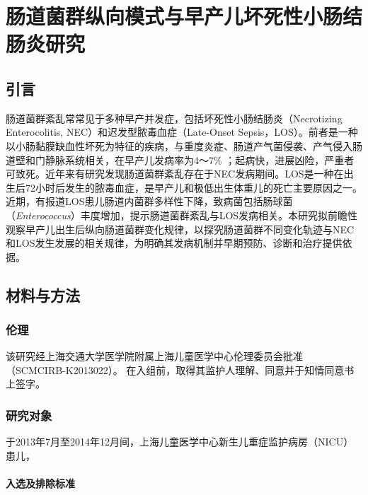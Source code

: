 
\chapter{肠道菌群纵向模式与早产儿坏死性小肠结肠炎研究}
\label{chap:nec}

\section{引言}
肠道菌群紊乱常常见于多种早产并发症，包括坏死性小肠结肠炎（Necrotizing Enterocolitis, NEC）和迟发型脓毒血症（Late-Onset Sepsis，LOS）。前者是一种以小肠黏膜缺血性坏死为特征的疾病，与重度炎症、肠道产气菌侵袭、产气侵入肠道壁和门静脉系统相关\cite{neu2011necrotizing}，在早产儿发病率为4～7\% \cite{rees2010nationa}；起病快，进展凶险，严重者可致死。近年来有研究发现肠道菌群紊乱存在于NEC发病期间。LOS是一种在出生后72小时后发生的脓毒血症，是早产儿和极低出生体重儿的死亡主要原因之一\cite{stoll2002late}。近期，有报道LOS患儿肠道内菌群多样性下降\cite{mai2013distortions}，致病菌包括肠球菌（\textit{Enterococcus}）丰度增加\cite{stewart2017longitudinal}，提示肠道菌群紊乱与LOS发病相关。本研究拟前瞻性观察早产儿出生后纵向肠道菌群变化规律，以探究肠道菌群不同变化轨迹与NEC和LOS发生发展的相关规律，为明确其发病机制并早期预防、诊断和治疗提供依据。

\section{材料与方法}
  \subsection{伦理}
  该研究经上海交通大学医学院附属上海儿童医学中心伦理委员会批准（SCMCIRB-K2013022）。 在入组前，取得其监护人理解、同意并于知情同意书上签字。
  \subsection{研究对象}
  于2013年7月至2014年12月间，上海儿童医学中心新生儿重症监护病房（NICU）患儿，
    \subsubsection{入选及排除标准}
